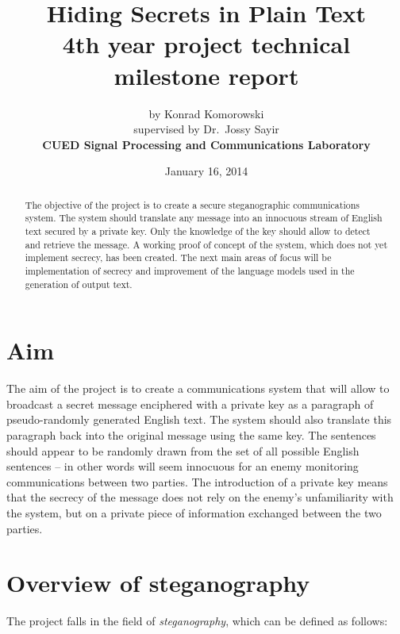 \documentclass[12pt,twoside,a4paper]{article}
\begin{document}
\title{Hiding Secrets in Plain Text \\ {\large \textbf{4th year project technical milestone report}}}
\author{by Konrad Komorowski \\ {supervised by Dr.~Jossy Sayir} \\ {\normalsize \textbf{CUED Signal Processing and Communications Laboratory}}}
\date{January 16, 2014}
\maketitle

\begin{abstract}
The objective of the project is to create a secure steganographic communications system. The system should translate any message into an innocuous stream of English text secured by a private key. Only the knowledge of the key should allow to detect and retrieve the message. A working proof of concept of the system, which does not yet implement secrecy, has been created. The next main areas of focus will be implementation of secrecy and improvement of the language models used in the generation of output text.
\end{abstract}

\section{Aim}
\label{sec:aim}

The aim of the project is to create a communications system that will allow to broadcast a secret message enciphered with a private key as a paragraph of pseudo-randomly generated English text. The system should also translate this paragraph back into the original message using the same key. The sentences should appear to be randomly drawn from the set of all possible English sentences -- in other words will seem innocuous for an enemy monitoring communications between two parties. The introduction of a private key means that the secrecy of the message does not rely on the enemy's unfamiliarity with the system, but on a private piece of information exchanged between the two parties.

\section{Overview of steganography}
\label{sec:steganography_overview}

The project falls in the field of \emph{steganography}, which can be defined as follows:
\end{document}
